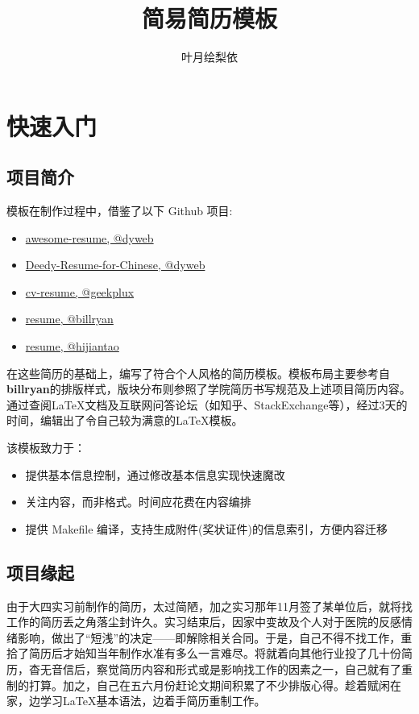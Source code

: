 \documentclass[a4paper,12pt]{ctexart}
\title{简易简历模板}
\author{叶月绘梨依}
\newenvironment{ul}{
	\begin{itemize}[topsep=0pt,labelsep=.5em,leftmargin=4.5em,itemsep=-.5em]
	}{\end{itemize}}
\begin{document}
	\maketitle
	\setcounter{page}{0}
	\thispagestyle{empty}
	
	\newpage
	\setcounter{page}{1}
	\section{快速入门}
	\subsection{项目简介}
	模板在制作过程中，借鉴了以下 Github 项目:
	\begin{ul}
		\item\href{https://github.com/dyweb/awesome-resume-for-chinese}{awesome-resume, @dyweb}
		\item\href{https://github.com/dyweb/Deedy-Resume-for-Chinese}{Deedy-Resume-for-Chinese, @dyweb}
		\item\href{https://github.com/geekplux/cv_resume}{cv-resume, @geekplux}
		\item\href{https://github.com/billryan/resume}{resume, @billryan}
		\item\href{https://github.com/hijiangtao/resume}{resume, @hijiantao}
	\end{ul}
	
	在这些简历的基础上，编写了符合个人风格的简历模板。模板布局主要参考自 \textbf{billryan}的排版样式，版块分布则参照了学院简历书写规范及上述项目简历内容。通过查阅\LaTeX{}文档及互联网问答论坛（如知乎、StackExchange等），经过3天的时间，编辑出了令自己较为满意的\LaTeX 模板。
	

	该模板致力于：
	\begin{ul}
		\item 提供基本信息控制，通过修改基本信息实现快速魔改
		\item 关注内容，而非格式。时间应花费在内容编排
		\item 提供 Makefile 编译，支持生成附件(奖状证件)的信息索引，方便内容迁移
	\end{ul}
	
	\subsection{项目缘起}
	由于大四实习前制作的简历，太过简陋，加之实习那年11月签了某单位后，就将找工作的简历丢之角落尘封许久。实习结束后，因家中变故及个人对于医院的反感情绪影响，做出了“短浅”的决定——即解除相关合同。于是，自己不得不找工作，重拾了简历后才始知当年制作水准有多么一言难尽。将就着向其他行业投了几十份简历，杳无音信后，察觉简历内容和形式或是影响找工作的因素之一，自己就有了重制的打算。加之，自己在五六月份赶论文期间积累了不少排版心得。趁着赋闲在家，边学习\LaTeX 基本语法，边着手简历重制工作。
	
\end{document}
